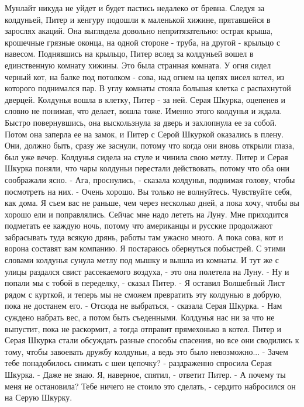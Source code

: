 Мунлайт никуда не уйдет и будет пастись недалеко от бревна.
    Следуя за колдуньей, Питер и кенгуру подошли к маленькой хижине, 
прятавшейся в зарослях акаций. Она выглядела довольно непритязательно: 
острая крыша, крошечные грязные оконца, на одной стороне - труба, на 
другой - крыльцо с навесом.
    Поднявшись на крыльцо, Питер вслед за колдуньей вошел в 
единственную комнату хижины. Это была странная комната. У огня сидел 
черный кот, на балке под потолком - сова, над огнем на цепях висел 
котел, из которого поднимался пар.
    В углу комнаты стояла большая клетка с распахнутой дверцей. 
Колдунья вошла в клетку, Питер - за ней. Серая Шкурка, оцепенев и 
словно не понимая, что делает, вошла тоже.
    Именно этого колдунья и ждала. Быстро повернувшись, она 
выскользнула за дверь и захлопнула ее за собой. Потом она заперла ее 
на замок, и Питер с Серой Шкуркой оказались в плену.
    Они, должно быть, сразу же заснули, потому что когда они вновь 
открыли глаза, был уже вечер. Колдунья сидела на стуле и чинила свою 
метлу. Питер и Серая Шкурка поняли, что чары колдуньи перестали 
действовать, потому что оба они соображали ясно.
    - Ага, проснулись, - сказала колдунья, поднимая голову, чтобы 
посмотреть на них. - Очень хорошо. Вы только не волнуйтесь. Чувствуйте 
себя, как дома. Я съем вас не раньше, чем через несколько дней, а пока 
хочу, чтобы вы хорошо ели и поправлялись. Сейчас мне надо лететь на 
Луну. Мне приходится подметать ее каждую ночь, потому что американцы и 
русские продолжают забрасывать туда всякую дрянь, работы там ужасно 
много. А пока сова, кот и ворона составят вам компанию. Я постараюсь 
обернуться побыстрей.
    С этими словами колдунья сунула метлу под мышку и вышла из 
комнаты. И тут же с улицы раздался свист рассекаемого воздуха, - это 
она полетела на Луну.
    - Ну и попали мы с тобой в переделку, - сказал Питер. - Я оставил 
Волшебный Лист рядом с курткой, и теперь мы не сможем превратить эту 
колдунью в добрую, пока не достанем его.
    - Отсюда не выбраться, - сказала Серая Шкурка. - Нам суждено 
набрать вес, а потом быть съеденными. Колдунья нас ни за что не 
выпустит, пока не раскормит, а тогда отправит прямехонько в котел.
    Питер и Серая Шкурка стали обсуждать разные способы спасения, но 
все они сводились к тому, чтобы завоевать дружбу колдуньи, а ведь это 
было невозможно...
    - Зачем тебе понадобилось снимать с шеи цепочку? - раздраженно 
спросила Серая Шкурка.
    - Даже не знаю. Я, наверное, спятил, - ответит Питер. - А почему 
ты меня не остановила? Тебе ничего не стоило это сделать, - сердито 
набросился он на Серую Шкурку.
